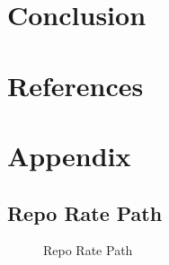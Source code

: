 \documentclass[
  letterpaper,
  DIV=11,
  numbers=noendperiod]{scrartcl}
\begin{document}
\section{Conclusion}\label{conclusion}

\newpage

\section*{References}\label{references}

\renewcommand{\bibsection}{}


\setcounter{section}{0}
\renewcommand{\thesection}{\Alph{section}}

\setcounter{table}{0}
\renewcommand{\thetable}{A\arabic{table}}

\setcounter{figure}{0}
\renewcommand{\thefigure}{A\arabic{figure}}

\newpage

\section{Appendix}\label{appendix}

\subsection{Repo Rate Path}\label{repo-rate-path}

\begin{figure}[H]


\caption{\label{fig-repo_rate}Repo Rate Path}

\end{figure}%
\end{document}
